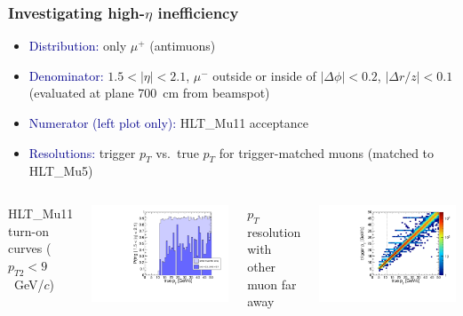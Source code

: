 \documentclass[compress]{beamer}
\begin{document}
\begin{frame}
\frametitle{Investigating high-$\eta$ inefficiency}
\begin{itemize}
\item \textcolor{darkblue}{Distribution:} only $\mu^+$ (antimuons)

\item \textcolor{darkblue}{Denominator:} $1.5 < |\eta| < 2.1$, $\mu^-$ outside or inside of $|\Delta \phi| < 0.2$, $|\Delta r/z| < 0.1$ (evaluated at plane 700~cm from beamspot)

\item \textcolor{darkblue}{Numerator (left plot only):} HLT\_Mu11 acceptance

\item \textcolor{darkblue}{Resolutions:} trigger $p_T$ vs.\ true $p_T$ for trigger-matched muons (matched to HLT\_Mu5)
\end{itemize}

\vfill
\begin{columns}
\centering HLT\_Mu11 turn-on curves ($p_{T2} < 9$~GeV/$c$)

\includegraphics[width=\linewidth]{trigger_turnonMu11.pdf}

\centering $p_T$ resolution with other muon far away

\includegraphics[width=\linewidth]{trigger_resolution_faraway.pdf}


\end{columns}
\end{frame}
\end{document}
